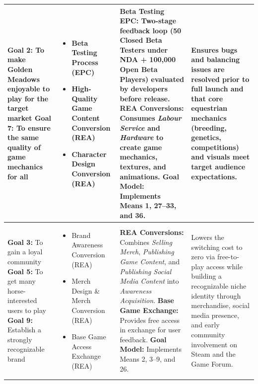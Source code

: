 \documentclass{article}
\begin{document}
{\begin{longtable}{L{0.20\textwidth} L{0.22\textwidth} L{0.26\textwidth} L{0.26\textwidth}}
    \textbf{Goal 2:} To make Golden Meadows enjoyable to play for the target market \newline
    \textbf{Goal 7:} To ensure the same quality of game mechanics for all
    & \begin{itemize}
        \item Beta Testing Process (EPC)
        \item High-Quality Game Content Conversion (REA)
        \item Character Design Conversion (REA)
    \end{itemize}
    & \textbf{Beta Testing EPC:} Two-stage feedback loop (50 Closed Beta Testers under NDA + 100,000 Open Beta Players) evaluated by developers before release.\newline
      \textbf{REA Conversions:} Consumes \textit{Labour Service} and \textit{Hardware} to create game mechanics, textures, and animations.\newline
      \textbf{Goal Model:} Implements Means 1, 27--33, and 36.
    & Ensures bugs and balancing issues are resolved prior to full launch and that core equestrian mechanics (breeding, genetics, competitions) and visuals meet target audience expectations. \\
    \midrule

    \textbf{Goal 3:} To gain a loyal community \newline
    \textbf{Goal 5:} To get many horse-interested users to play \newline
    \textbf{Goal 9:} Establish a strongly recognizable brand
    & \begin{itemize}
        \item Brand Awareness Conversion (REA)
        \item Merch Design \& Merch Conversion (REA)
        \item Base Game Access Exchange (REA)
    \end{itemize}
    & \textbf{REA Conversions:} Combines \textit{Selling Merch}, \textit{Publishing Game Content}, and \textit{Publishing Social Media Content} into \textit{Awareness Acquisition}.\newline
      \textbf{Base Game Exchange:} Provides free access in exchange for user feedback.\newline
      \textbf{Goal Model:} Implements Means 2, 3--9, and 26.
    & Lowers the switching cost to zero via free-to-play access while building a recognizable niche identity through merchandise, social media presence, and early community involvement on Steam and the Game Forum. \\
    \midrule


\end{longtable}}
\end{document}
